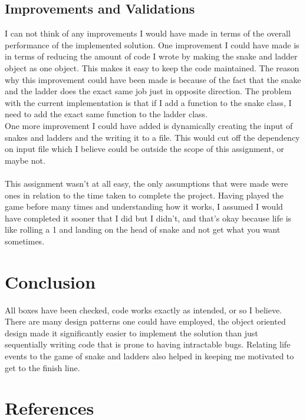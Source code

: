 \subsection*{Improvements and Validations}
I can not think of any improvements I would have made in terms of the overall performance of the implemented solution. One improvement I could have made is in terms of reducing the amount of code I wrote by making the snake and ladder object as one object. This makes it easy to keep the code maintained. The reason why this improvement could have been made is because of the fact that the snake and the ladder does the exact same job just in opposite direction. The problem with the current implementation is that if I add a function to the snake class, I need to add the exact same function to the ladder class.\\
One more improvement I could have added is dynamically creating the input of snakes and ladders and the writing it to a file. This would cut off the dependency on input file which I believe could be outside the scope of this assignment, or maybe not. \\ \\
This assignment wasn't at all easy, the only assumptions that were made were ones in relation to the time taken to complete the project. Having played the game before many times and understanding how it works, I assumed I would have completed it sooner that I did but I didn't, and that's okay because life is like rolling a 1 and landing on the head of snake and not get what you want sometimes. 

\section*{Conclusion}
All boxes have been checked, code works exactly as intended, or so I believe. There are many design patterns one could have employed, the object oriented design made it significantly easier to implement the solution than just sequentially writing code that is prone to having intractable bugs. Relating life events to the game of snake and ladders also helped in keeping me motivated to get to the finish line.

\newpage
\section*{References}

